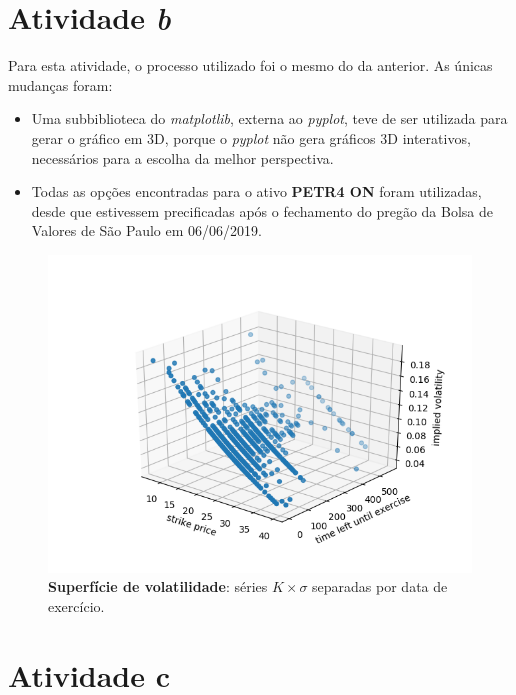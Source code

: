 \documentclass{article}
\begin{document}
\section*{Atividade \emph{b}}

Para esta atividade, o processo utilizado foi o mesmo do da anterior.
As únicas mudanças foram:

\begin{itemize}
	\item Uma subbiblioteca do \emph{matplotlib}, externa ao \emph{pyplot}, teve de ser utilizada para gerar o gráfico em 3D, porque o \emph{pyplot} não gera gráficos 3D interativos, necessários para a escolha da melhor perspectiva.
	\item Todas as opções encontradas para o ativo \textbf{PETR4 ON} foram utilizadas, desde que estivessem precificadas após o fechamento do pregão da Bolsa de Valores de São Paulo em 06/06/2019.
\end{itemize}

\begin{figure}[H]
	\includegraphics[width=\linewidth]{Figure_3.png}
	\centering
	
	\caption{\textbf{Superfície de volatilidade}: séries $K \times \sigma$ separadas por data de exercício.}
	\label{}
\end{figure}


\section*{Atividade c}
\end{document}
